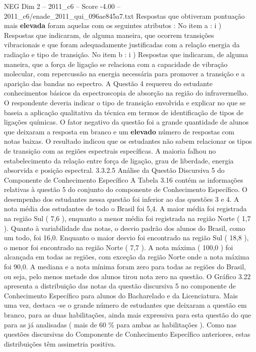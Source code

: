 \begin{textsample}{NEG Dim 2 – 2011\_c6 – Score -4.00 – 2011\_c6/enade\_2011\_qui\_096ae845a7.txt}
Respostas que obtiveram pontuação mais \textbf{elevada} foram aquelas com os seguintes atributos : No item a : i ) Respostas que indicaram, de alguma maneira, que ocorrem transições vibracionais e que foram adequadamente justificadas com a relação energia da radiação e tipo de transição.
No item b : i ) Respostas que indicaram, de alguma maneira, que a força de ligação se relaciona com a capacidade de vibração molecular, com repercussão na energia necessária para promover a transição e a aparição das bandas no espectro.
A Questão 4 requereu do estudante conhecimentos básicos da espectroscopia de absorção na região do infravermelho.
O respondente deveria indicar o tipo de transição envolvida e explicar no que se baseia a aplicação qualitativa da técnica em termos de identificação de tipos de ligações químicas.
O fator negativo da questão foi a grande quantidade de alunos que deixaram a resposta em branco e um \textbf{elevado} número de respostas com notas baixas.
O resultado indicou que os estudantes não sabem relacionar os tipos de transição com as regiões espectrais específicas.
A maioria falhou no estabelecimento da relação entre força de ligação, grau de liberdade, energia absorvida e posição espectral. 3.3.2.5 Análise da Questão Discursiva 5 do Componente de Conhecimento Específico A Tabela 3.16 contém as informações relativas à questão 5 do conjunto do componente de Conhecimento Específico.
O desempenho dos estudantes nessa questão foi inferior ao das questões 3 e 4.
A nota média dos estudantes de todo o Brasil foi 5,4.
A maior média foi registrada na região Sul ( 7,6 ), enquanto a menor média foi registrada na região Norte ( 1,7 ).
Quanto à variabilidade das notas, o desvio padrão dos alunos do Brasil, como um todo, foi 16,0.
Enquanto o maior desvio foi encontrado na região Sul ( 18,8 ), o menor foi encontrado na região Norte ( 7,7 ).
A nota máxima ( 100,0 ) foi alcançada em todas as regiões, com exceção da região Norte onde a nota máxima foi 90,0.
A mediana e a nota mínima foram zero para todas as regiões do Brasil, ou seja, pelo menos metade dos alunos tirou nota zero na questão.
O Gráfico 3.22 apresenta a distribuição das notas da questão discursiva 5 no componente de Conhecimento Específico para alunos do Bacharelado e da Licenciatura.
Mais uma vez, destaca -se o grande número de estudantes que deixaram a questão em branco, para as duas habilitações, ainda mais expressiva para esta questão do que para as já analisadas ( mais de 60 \% para ambas as habilitações ).
Como nas questões discursivas do Componente de Conhecimento Específico anteriores, estas distribuições têm assimetria positiva.

\end{textsample}
